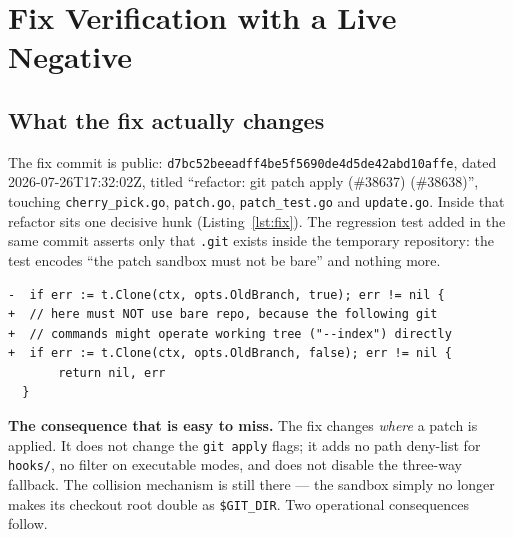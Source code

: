 \section{Fix Verification with a Live Negative}
\label{sec:fix}

\subsection{What the fix actually changes}
\label{sec:fixchange}

The fix commit is public: \texttt{d7bc52be\allowbreak eadff4be5f5690de4d5de42a\allowbreak bd10affe},
dated 2026-07-26T17:32:02Z, titled ``refactor: git patch apply (\#38637)
(\#38638)'', touching \texttt{cherry\_pick.go}, \texttt{patch.go},
\texttt{patch\_test.go} and \texttt{update.go}. Inside that refactor sits one
decisive hunk (Listing~\ref{lst:fix}). The regression test added in the same
commit asserts only that \texttt{.git} exists inside the temporary repository:
the test encodes ``the patch sandbox must not be bare'' and nothing more.

\begin{lstlisting}[style=diffsrc,
caption={The decisive hunk of the fix (\texttt{services/repository/files/patch.go};
full diff in \texttt{designs/fix-commit-full.diff}). One boolean turns the patch
sandbox from bare to non-bare. The \texttt{git apply} flags of
Listing~\ref{lst:apply} are not touched.},
label={lst:fix}]
-  if err := t.Clone(ctx, opts.OldBranch, true); err != nil {
+  // here must NOT use bare repo, because the following git
+  // commands might operate working tree ("--index") directly
+  if err := t.Clone(ctx, opts.OldBranch, false); err != nil {
       return nil, err
  }
\end{lstlisting}

\textbf{The consequence that is easy to miss.} The fix changes \emph{where} a
patch is applied. It does not change the \texttt{git apply} flags; it adds no
path deny-list for \texttt{hooks/}, no filter on executable modes, and does not
disable the three-way fallback. The collision mechanism is still there --- the
sandbox simply no longer makes its checkout root double as
\texttt{\$GIT\_DIR}. Two operational consequences follow.

